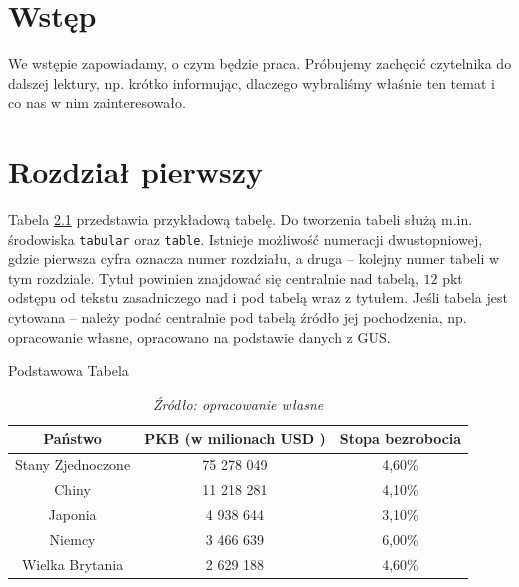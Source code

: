 \documentclass[inzynierska]{pwr_wmat_praca_dyplomowa}
\theoremstyle{plain}
\numberwithin{theorem}{chapter}
\theoremstyle{definition}
\numberwithin{theorem}{chapter}
\begin{document}
\frontmatter
\maketitle
\mainmatter
\tableofcontents

{\backmatter \chapter{Wstęp}}
We wstępie zapowiadamy, o czym będzie praca. Próbujemy zachęcić czytelnika do dalszej lektury, np. krótko informując, dlaczego wybraliśmy właśnie ten temat i co nas w nim zainteresowało.

\chapter{Rozdział pierwszy}
Tabela \ref{tab:przykladowa} przedstawia przykładową tabelę. Do tworzenia tabeli służą m.in. środowiska \texttt{tabular} oraz \texttt{table}. Istnieje możliwość numeracji dwustopniowej, gdzie pierwsza cyfra oznacza numer rozdziału, a druga – kolejny numer tabeli w tym rozdziale. Tytuł powinien znajdować się centralnie nad tabelą, $12$ pkt odstępu od tekstu zasadniczego nad i pod tabelą wraz z tytułem. Jeśli tabela jest cytowana – należy podać centralnie pod tabelą źródło jej pochodzenia, np. opracowanie własne, opracowano na podstawie danych z GUS.
\begin{table}[ht]
\caption{Podstawowa Tabela}
\centering
\begin{tabular}{ccc}
\hline
\hline                       
Państwo & PKB (w milionach USD )& Stopa bezrobocia  \\  [0.5ex] 
\hline 
Stany Zjednoczone & 75 278 049 & 4,60\%  \\
Chiny & 11 218 281 & 4,10\%   \\
Japonia & 4 938 644 & 3,10\%  \\
Niemcy & 3 466 639 & 6,00\%   \\
Wielka Brytania & 2 629 188 & 4,60\%  \\ [1ex]  
\hline 
\end{tabular}
\caption*{\textit{Źródło: opracowanie własne}}
\label{tab:przykladowa} 
\end{table}

\end{document}
